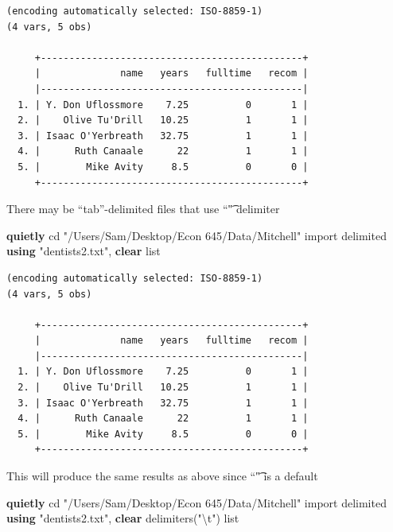 \documentclass[
]{book}
\newenvironment{Shaded}{\begin{snugshade}}{\end{snugshade}}
\newcommand{\CharTok}[1]{\textcolor[rgb]{0.31,0.60,0.02}{#1}}
\newcommand{\KeywordTok}[1]{\textcolor[rgb]{0.13,0.29,0.53}{\textbf{#1}}}
\newcommand{\NormalTok}[1]{#1}
\newcommand{\OtherTok}[1]{\textcolor[rgb]{0.56,0.35,0.01}{#1}}
\newcommand{\StringTok}[1]{\textcolor[rgb]{0.31,0.60,0.02}{#1}}
\begin{document}
\begin{verbatim}
(encoding automatically selected: ISO-8859-1)
(4 vars, 5 obs)

     +----------------------------------------------+
     |              name   years   fulltime   recom |
     |----------------------------------------------|
  1. | Y. Don Uflossmore    7.25          0       1 |
  2. |    Olive Tu'Drill   10.25          1       1 |
  3. | Isaac O'Yerbreath   32.75          1       1 |
  4. |      Ruth Canaale      22          1       1 |
  5. |        Mike Avity     8.5          0       0 |
     +----------------------------------------------+
\end{verbatim}

There may be ``tab''-delimited files that use ``\t" delimiter

\begin{Shaded}
\begin{Highlighting}[]
\KeywordTok{quietly}\NormalTok{ cd }\StringTok{"/Users/Sam/Desktop/Econ 645/Data/Mitchell"}
\NormalTok{import delimited }\KeywordTok{using} \StringTok{"dentists2.txt"}\NormalTok{, }\KeywordTok{clear}
\OtherTok{list}
\end{Highlighting}
\end{Shaded}

\begin{verbatim}
(encoding automatically selected: ISO-8859-1)
(4 vars, 5 obs)

     +----------------------------------------------+
     |              name   years   fulltime   recom |
     |----------------------------------------------|
  1. | Y. Don Uflossmore    7.25          0       1 |
  2. |    Olive Tu'Drill   10.25          1       1 |
  3. | Isaac O'Yerbreath   32.75          1       1 |
  4. |      Ruth Canaale      22          1       1 |
  5. |        Mike Avity     8.5          0       0 |
     +----------------------------------------------+
\end{verbatim}

This will produce the same results as above since ``\t" is a default

\begin{Shaded}
\begin{Highlighting}[]
\KeywordTok{quietly}\NormalTok{ cd }\StringTok{"/Users/Sam/Desktop/Econ 645/Data/Mitchell"}
\NormalTok{import delimited }\KeywordTok{using} \StringTok{"dentists2.txt"}\NormalTok{, }\KeywordTok{clear}\NormalTok{ delimiters(}\StringTok{"}\CharTok{\textbackslash{}t}\StringTok{"}\NormalTok{)}
\OtherTok{list}
\end{Highlighting}
\end{Shaded}
\end{document}
